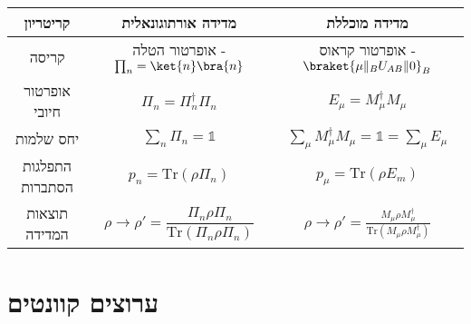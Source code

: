 \documentclass{tstextbook}
\begin{document}
\begin{summary}
  \begin{table}[htbp]
    \centering
    \begin{tabular}{|ccc|}
      \hline
      קריטריון & מדידה אורתוגונאלית & מדידה מוכללת \\ \hline
      קריסה & אופרטור הטלה - \(\prod_{n}=\ket{n}\bra{n}\) & אופרטור קראוס - \(\braket{ \mu \| _{B} U_{AB}\|0 }_{B}\) \\ \hline
      אופרטור חיובי & \(\Pi_{n}=\Pi_{n}^{\dagger}\Pi_{n}\) & \(E_{\mu}=M_{\mu}^{\dagger}M_{\mu}\) \\ \hline
      יחס שלמות & \(\sum_{n}\Pi_{n}=\mathbb{1}\) & \(\sum_{\mu} M_{\mu}^{\dagger}M_{\mu}=\mathbb{1}=\sum_{\mu}E_{\mu}\) \\ \hline
      התפלגות הסתברות & \(p_{n}=\mathrm{Tr}\left( \rho \Pi_{n} \right)\) & \(p_{\mu}=\mathrm{Tr}\left( \rho E_{m} \right)\) \\ \hline
      תוצאות המדידה & $$\rho\to \rho' = \frac{\Pi_{n}\rho \Pi_{n}}{\mathrm{Tr}\left( \Pi_{n}\rho \Pi_{n} \right)}$$ & \(\rho\to \rho' = \frac{M_{\mu}\rho M_{\mu}^{\dagger}}{\mathrm{Tr}\left( M_{\mu}\rho M_{\mu}^{\dagger} \right)}\) \\ \hline
    \end{tabular}
  \end{table}
\end{summary}
\section{ערוצים קוונטים}
\end{document}
